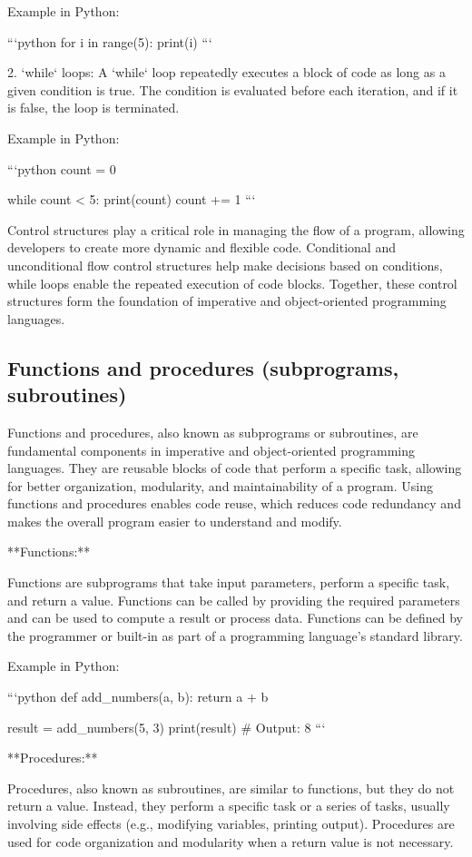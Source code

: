 \documentclass{article}
\begin{document}
Example in Python:

```python
for i in range(5):
    print(i)
```

2. `while` loops: A `while` loop repeatedly executes a block of code as long as a given condition is true. The condition is evaluated before each iteration, and if it is false, the loop is terminated.

Example in Python:

```python
count = 0

while count < 5:
    print(count)
    count += 1
```

Control structures play a critical role in managing the flow of a program, allowing developers to create more dynamic and flexible code. Conditional and unconditional flow control structures help make decisions based on conditions, while loops enable the repeated execution of code blocks. Together, these control structures form the foundation of imperative and object-oriented programming languages.


\subsection{Functions and procedures (subprograms, subroutines)}

Functions and procedures, also known as subprograms or subroutines, are fundamental components in imperative and object-oriented programming languages. They are reusable blocks of code that perform a specific task, allowing for better organization, modularity, and maintainability of a program. Using functions and procedures enables code reuse, which reduces code redundancy and makes the overall program easier to understand and modify.

**Functions:**

Functions are subprograms that take input parameters, perform a specific task, and return a value. Functions can be called by providing the required parameters and can be used to compute a result or process data. Functions can be defined by the programmer or built-in as part of a programming language's standard library.

Example in Python:

```python
def add_numbers(a, b):
    return a + b

result = add_numbers(5, 3)
print(result)  # Output: 8
```

**Procedures:**

Procedures, also known as subroutines, are similar to functions, but they do not return a value. Instead, they perform a specific task or a series of tasks, usually involving side effects (e.g., modifying variables, printing output). Procedures are used for code organization and modularity when a return value is not necessary.
\end{document}
